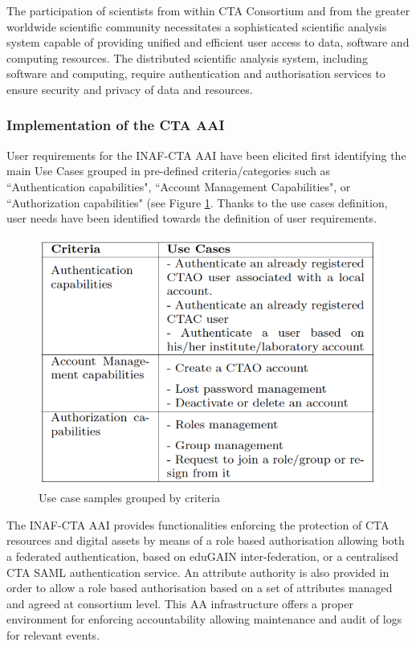 \documentclass[fleqn,10pt]{wlscirep}
\begin{document}
{The participation of scientists from within CTA Consortium and from the greater worldwide scientific community necessitates a sophisticated scientific analysis system capable of providing unified and efficient user access to data, software and computing resources\cite{cta-data-man}.
The distributed scientific analysis system, including software and computing, require authentication and authorisation services to ensure security and privacy of data and resources.

\subsubsection{Implementation of the CTA AAI}
User requirements for the INAF-CTA AAI have been elicited first identifying the main Use Cases grouped in pre-defined criteria/categories such as ``Authentication capabilities", ``Account Management Capabilities", or ``Authorization capabilities" (see Figure \ref{fig:ctatable}. Thanks to the use cases definition, user needs have been identified towards the definition of user requirements.
 
\begin{figure}[ht!]
  \centering
  \includegraphics[width=0.7\columnwidth]{cta-table.png}
  \caption{Use case samples grouped by criteria}
  \label{fig:ctatable}
\end{figure}

The INAF-CTA AAI provides functionalities enforcing the protection of CTA resources and digital assets by means of a role based authorisation allowing both a federated  authentication, based on eduGAIN inter-federation, or a centralised CTA SAML authentication service. An attribute authority is also provided in order to allow a role based  authorisation based on a set of attributes managed and agreed at consortium level. This AA infrastructure offers a proper environment  for enforcing accountability  allowing  maintenance and audit of logs for relevant events.

}
\end{document}
